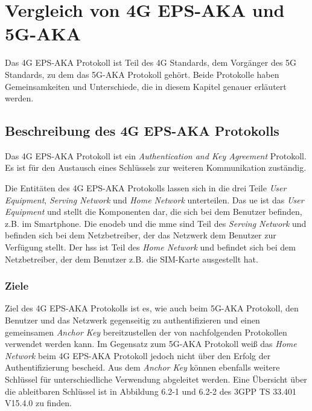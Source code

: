 \chapter{Vergleich von 4G EPS-AKA und 5G-AKA}
\label{chap:3}

Das 4G EPS-AKA Protokoll ist Teil des 4G Standards, dem Vorgänger des 5G Standards, zu dem das 5G-AKA Protokoll gehört.
Beide Protokolle haben Gemeinsamkeiten und Unterschiede, die in diesem Kapitel genauer erläutert werden.

\section{Beschreibung des 4G EPS-AKA Protokolls}

Das 4G EPS-AKA Protokoll ist ein \textit{Authentication and Key Agreement} Protokoll.
Es ist für den Austausch eines Schlüssels zur weiteren Kommunikation zuständig.

Die Entitäten des 4G EPS-AKA Protokolls lassen sich in die drei Teile \textit{User Equipment}, \textit{Serving Network} und \textit{Home Network} unterteilen.
Das \gls{ue} ist das \textit{User Equipment} und stellt die Komponenten dar, die sich bei dem Benutzer befinden, z.B. im Smartphone.
Die \gls{enodeb} und die \gls{mme} sind Teil des \textit{Serving Network} und befinden sich bei dem Netzbetreiber, der das Netzwerk dem Benutzer zur Verfügung stellt.
Der \gls{hss} ist Teil des \textit{Home Network} und befindet sich bei dem Netzbetreiber, der dem Benutzer z.B. die SIM-Karte ausgestellt hat. %

\subsection{Ziele}

Ziel des 4G EPS-AKA Protokolls ist es, wie auch beim 5G-AKA Protokoll, den Benutzer und das Netzwerk gegenseitig zu authentifizieren und einen gemeinsamen \textit{Anchor Key} bereitzustellen der von nachfolgenden Protokollen verwendet werden kann.
Im Gegensatz zum 5G-AKA Protokoll weiß das \textit{Home Network} beim 4G EPS-AKA Protokoll jedoch nicht über den Erfolg der Authentifizierung bescheid.
Aus dem \textit{Anchor Key} können ebenfalls weitere Schlüssel für unterschiedliche Verwendung abgeleitet werden.
Eine Übersicht über die ableitbaren Schlüssel ist in Abbildung 6.2-1 und 6.2-2 des 3GPP TS 33.401 V15.4.0 zu finden. %

